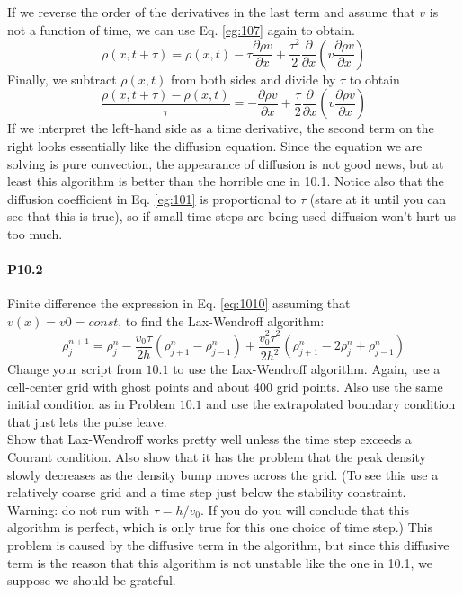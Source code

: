 \documentclass{book}
\theoremstyle{plain}
\theoremstyle{definition}
\numberwithin{exm}{chapter}
\theoremstyle{remark}
\theoremstyle{summary}
\theoremstyle{overview}
\begin{document}
If we reverse the order of the derivatives in the last term and assume that $v$ is not
a function of time, we can use Eq. \eqref{eg:107} again to obtain.
\begin{equation}\label{eq:109}
\rho(x, t+\tau)=\rho(x, t)-\tau \frac{\partial \rho v}{\partial x}+\frac{\tau^{2}}{2} \frac{\partial}{\partial x}\left(v \frac{\partial \rho v}{\partial x}\right)
\end{equation}
Finally, we subtract $ρ(x,t)$ from both sides and divide by $\tau$ to obtain
\begin{equation}\label{eq:1010}
\frac{\rho(x, t+\tau)-\rho(x, t)}{\tau}=-\frac{\partial \rho v}{\partial x}+\frac{\tau}{2} \frac{\partial}{\partial x}\left(v \frac{\partial \rho v}{\partial x}\right)
\end{equation}
If we interpret the left-hand side as a time derivative, the second term on the right looks essentially like the diffusion equation. Since the equation we are solving is pure convection, the appearance of diffusion is not good news, but at least this algorithm is better than the horrible one in 10.1. Notice also that the diffusion coefficient in Eq. \eqref{eg:101} is proportional to $\tau$ (stare at it until you can see that this is true), so if small time steps are being used diffusion won't hurt us too much.

\paragraph*{P10.2}
 Finite difference the expression in Eq. \eqref{eq:1010} assuming that $v(x) = v0 =
const$, to find the Lax-Wendroff algorithm:
\begin{equation}\label{eq:1011}
\rho_{j}^{n+1}=\rho_{j}^{n}-\frac{v_{0} \tau}{2 h}\left(\rho_{j+1}^{n}-\rho_{j-1}^{n}\right)+\frac{v_{0}^{2} \tau^{2}}{2 h^{2}}\left(\rho_{j+1}^{n}-2 \rho_{j}^{n}+\rho_{j-1}^{n}\right)
\end{equation}
Change your script from $10.1$ to use the Lax-Wendroff algorithm. Again, use a cell-center grid with ghost points and about 400 grid points. Also use the same initial condition as in Problem $10.1$ and use the extrapolated boundary condition that just lets the pulse leave.\\
Show that Lax-Wendroff works pretty well unless the time step exceeds a Courant condition. Also show that it has the problem that the peak density slowly decreases as the density bump moves across the grid. (To see this use a relatively coarse grid and a time step just below the stability constraint.\\
Warning: do not run with $\tau=h / v_{0}$. If you do you will conclude that this algorithm is perfect, which is only true for this one choice of time step.) This problem is caused by the diffusive term in the algorithm, but since this diffusive term is the reason that this algorithm is not unstable like the one in 10.1, we suppose we should be grateful.
\end{document}
